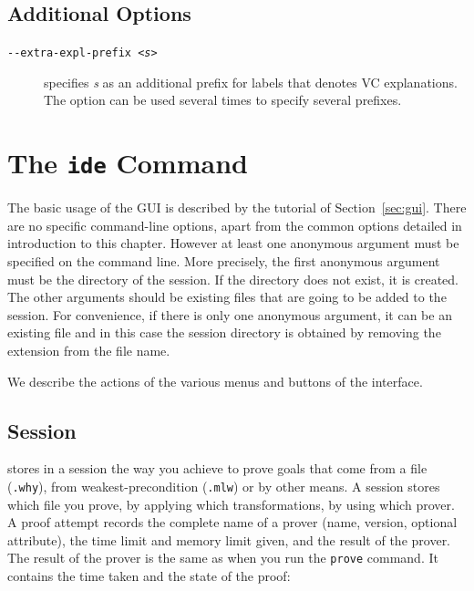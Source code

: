 \subsection{Additional Options}
\label{sec:proveoptions}

\begin{description}
\item[\texttt{-{}-extra-expl-prefix \textsl{<s>}}] specifies
  \textsl{s} as an additional prefix for labels that denotes VC
  explanations. The option can be used several times to specify
  several prefixes.
\end{description}

\section{The \texttt{ide} Command}
\label{sec:ideref}


The basic usage of the GUI is described by the tutorial of
Section~\ref{sec:gui}. There are no specific command-line options,
apart from the common options detailed in introduction to this
chapter. However at least one anonymous argument must be specified on
the command line. More precisely, the first anonymous argument must be
the directory of the session. If the directory does not exist, it is
created. The other arguments should be existing files that are going
to be added to the session. For convenience,
if there is only one anonymous argument, it can be an existing file and
in this case the session directory is obtained by removing the extension
from the file name.

We describe the actions of the various menus and buttons of the
interface.

\subsection{Session}
\label{sec:idref:session}
\why stores in a session the way you achieve to prove goals that come
from a file (\texttt{.why}), from weakest-precondition (\texttt{.mlw}) or by other
means. A session stores which file you prove, by applying which
transformations, by using which prover. A proof attempt records the
complete name of a prover (name, version, optional attribute), the
time limit and memory limit given, and the result of the prover. The
result of the prover is the same as when you run the \texttt{prove} command. It
contains the time taken and the state of the proof:

